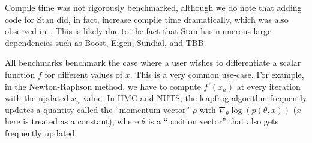 Compile time was not rigorously benchmarked, 
although we do note that adding code for Stan did, in fact,
increase compile time dramatically, which was also observed in~\cite{carpenter:2015}.
This is likely due to the fact that Stan has numerous large dependencies
such as Boost, Eigen, Sundial, and TBB.

All benchmarks benchmark the case where a user wishes to differentiate
a scalar function $f$ for different values of $x$.
This is a very common use-case.
For example, in the Newton-Raphson method,
we have to compute $f'(x_n)$ at every iteration with the updated $x_n$ value.
In HMC and NUTS, the leapfrog algorithm frequently
updates a quantity called the ``momentum vector'' $\rho$ 
with $\nabla_\theta \log(p(\theta, x))$ ($x$ here is treated as a constant),
where $\theta$ is a ``position vector'' that also gets frequently updated.

